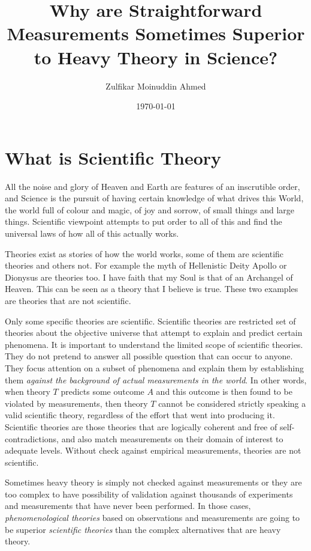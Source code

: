 \documentclass{amsart}
\title{Why are Straightforward Measurements Sometimes Superior to Heavy Theory in Science?}
\author{Zulfikar Moinuddin Ahmed}
\date{\today}
\begin{document}
\maketitle

\section{What is Scientific Theory}

All the noise and glory of Heaven and Earth are features of an inscrutible order, and Science is the pursuit of having certain knowledge of what drives this World, the world full of colour and magic, of joy and sorrow, of small things and large things.  Scientific viewpoint attempts to put order to all of this and find the universal laws of how all of this actually works.

Theories exist as stories of how the world works, some of them are scientific theories and others not.  For example the myth of Hellenistic Deity Apollo or Dionysus are theories too.  I have faith that my Soul is that of an Archangel of Heaven.  This can be seen as a theory that I believe is true.  These two examples are theories that are not scientific.  

Only some specific theories are scientific.  Scientific theories are restricted set of theories about the objective universe that attempt to explain and predict certain phenomena.  It is important to understand the limited scope of scientific theories.  They do not pretend to answer all possible question that can occur to anyone. They focus attention on a subset of phenomena and explain them by establishing them {\em against the background of actual measurements in the world}.  In other words, when theory $T$ predicts some outcome $A$ and this outcome is then found to be violated by measurements, then theory $T$ cannot be considered strictly speaking a valid scientific theory, regardless of the effort that went into producing it.  Scientific theories are those theories that are logically coherent and free of self-contradictions, and also match measurements on their domain of interest to adequate levels.  Without check against empirical measurements, theories are not scientific.

Sometimes heavy theory is simply not checked against measurements or they are too complex to have possibility of validation against thousands of experiments and measurements that have never been performed.  In those cases, {\em phenomenological theories} based on observations and measurements are going to be superior {\em scientific theories} than the complex alternatives that are heavy theory.
\end{document}
